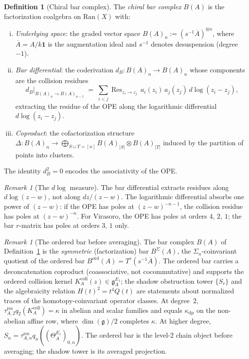 \documentclass[11pt]{article}
\theoremstyle{plain}
\theoremstyle{definition}
\newtheorem{definition}[theorem]{Definition}
\theoremstyle{remark}
\newtheorem{remark}[theorem]{Remark}
\newcommand{\fg}{\mathfrak{g}}
\newcommand{\Ran}{\mathrm{Ran}}
\newcommand{\Res}{\operatorname{Res}}
\begin{document}
\begin{definition}[Chiral bar complex]
\label{def:bar-complex}
The \emph{chiral bar complex} $B(A)$ is the factorization
coalgebra on $\Ran(X)$ with:
\begin{enumerate}[(i)]
\item \emph{Underlying space}: the graded vector space
 $B(A)_n := (s^{-1}\overline{A})^{\otimes n}$, where
 $\overline{A} = A / k\mathbf{1}$ is the augmentation ideal
 and $s^{-1}$ denotes desuspension (degree~$-1$).

\item \emph{Bar differential}: the coderivation
 $d_B\colon B(A)_n \to B(A)_n$ whose components are the
 collision residues
 \[
 d_B|_{B(A)_n \to B(A)_{n-1}}
 \;=\; \sum_{i < j} \Res_{z_i \to z_j}\,
 a_i(z_i)\,a_j(z_j)\,d\!\log(z_i - z_j),
 \]
 extracting the residue of the OPE along the logarithmic
 differential $d\!\log(z_i - z_j)$.

\item \emph{Coproduct}: the cofactorization structure
 $\Delta\colon B(A)_n \to \bigoplus_{S \sqcup T = [n]}
 B(A)_{|S|} \otimes B(A)_{|T|}$
 induced by the partition of points into clusters.
\end{enumerate}
The identity $d_B^2 = 0$ encodes the associativity of the OPE.
\end{definition}

\begin{remark}[The $d\!\log$ measure]
\label{rem:dlog-measure}
The bar differential extracts residues along $d\!\log(z-w)$,
not along $dz/(z-w)$. The logarithmic differential absorbs
one power of $(z-w)$: if the OPE has poles at
$(z-w)^{-n-1}$, the collision residue has poles at
$(z-w)^{-n}$. For Virasoro, the OPE has poles at orders
$4$, $2$, $1$; the bar $r$-matrix has poles at orders
$3$, $1$ only.
\end{remark}

\begin{remark}[The ordered bar before averaging]
\label{rem:ordered-bar-primitive}
The bar complex $B(A)$ of Definition~\ref{def:bar-complex} is the
\emph{symmetric} (factorization) bar $B^\Sigma(A)$, the
$\Sigma_n$-coinvariant quotient of the ordered bar
$B^{\mathrm{ord}}(A) = T^c(s^{-1}\overline{A})$. The ordered bar
carries a deconcatenation coproduct (coassociative, not
cocommutative) and supports the ordered collision kernel
$K_A^{\mathrm{coll}}(z)\in\mathfrak{g}^{E_1}_A$; the shadow obstruction tower
$\{S_r\}$ and the algebraicity relation $H(t)^2 = t^4 Q(t)$ are
statements about normalized traces of the homotopy-coinvariant
operator classes.  At degree~$2$,
$\tau_{A,2}^{\mathrm{res}}q_2(K_A^{\mathrm{coll}})=\kappa$ in
abelian and scalar families and equals $\kappa_{\mathrm{dp}}$ on the
non-abelian affine row, where $\dim(\fg)/2$ completes $\kappa$.
At higher degree,
$S_n=\tau_{A,n}^{\mathrm{res}}q_n((\Theta_A^{E_1})_{0,n})$.
The ordered bar is the level-$2$ chain object before averaging; the shadow tower is its
averaged projection.
\end{remark}
\end{document}
